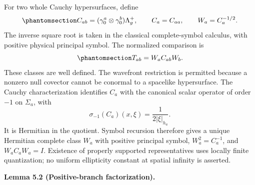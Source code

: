 \documentclass[
  english,
  11pt,
  reqno]{amsart}
\makeatletter
\newcommand{\pandocstatementheading}[1]{%
  \par\addpenalty{\@beginparpenalty}%
  \addvspace{.5\baselineskip plus .2\baselineskip minus .2\baselineskip}%
  {\normalfont\bfseries #1\par}%
  \nobreak\@afterindenttrue\@afterheading
}
\makeatother
\begin{document}
For two whole Cauchy hypersurfaces, define
\begin{equation}\protect\phantomsection\label{eq:global-mixed-carrier-traces}{
C_{ab}=(\gamma_0^a\otimes\gamma_0^b)\Lambda_g^+,
\qquad C_a=C_{aa},\qquad W_a=C_a^{-1/2}.
}\end{equation} The inverse square root is taken in the classical
complete-symbol calculus, with positive physical principal symbol. The
normalized comparison is
\begin{equation}\protect\phantomsection\label{eq:global-normalized-carrier}{
T_{ab}=W_aC_{ab}W_b.
}\end{equation} These classes are well defined. The wavefront
restriction is permitted because a nonzero null covector cannot be
conormal to a spacelike hypersurface. The Cauchy characterization
identifies \(C_a\) with the canonical scalar operator of order \(-1\) on
\(\Sigma_a\), with \[
\sigma_{-1}(C_a)(x,\xi)=\frac{1}{2|\xi|_{h_a}}.
\] It is Hermitian in the quotient. Symbol recursion therefore gives a
unique Hermitian complete class \(W_a\) with positive principal symbol,
\(W_a^2=C_a^{-1}\), and \(W_aC_aW_a=I\). Existence of properly supported
representatives uses locally finite quantization; no uniform ellipticity
constant at spatial infinity is asserted.

\pandocstatementheading{\protect{}\label{lem:global-positive-graph-factorization}Lemma 5.2 (Positive-branch factorization).}
\end{document}
